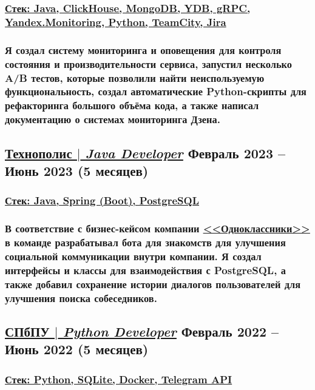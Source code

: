 \documentclass[11pt]{article}
\begin{document}
\subsubsection{\underline{\textbf{Стек}: Java, ClickHouse, MongoDB, YDB, gRPC, Yandex.Monitoring, Python, TeamCity, Jira}}
\subsubsection{Я создал \textbf{систему мониторинга и оповещения} для контроля состояния и производительности сервиса, запустил несколько \textbf{A/B тестов}, которые позволили найти неиспользуемую функциональность, создал \textbf{автоматические Python-скрипты} для рефакторинга большого объёма кода, а также \textbf{написал документацию} о системах мониторинга Дзена.}
\begin{itemize}
\end{itemize}

\subsection{\href{https://github.com/Sanerins/tamtam-one-coffee-bot}{\underline{Технополис $|$ {\normalfont\textit{Java Developer}}}} \hfill Февраль 2023 -- Июнь 2023 (5 месяцев)}
\subsubsection{\underline{\textbf{Стек}: Java, Spring (Boot), PostgreSQL}}
\subsubsection{В соответствие с бизнес-кейсом компании \href{https://ok.ru/}{\underline{<<Одноклассники>>}} в команде разрабатывал бота для знакомств для улучшения социальной коммуникации внутри компании. Я создал \textbf{интерфейсы и классы для взаимодействия с PostgreSQL}, а также добавил \textbf{сохранение истории диалогов пользователей} для улучшения поиска собеседников.}
\begin{itemize}
\end{itemize}

\subsection{\href{https://github.com/PaaavelZ/FPA-pybot}{\underline{СПбПУ $|$ {\normalfont\textit{Python Developer}}}} \hfill Февраль 2022 -- Июнь 2022 (5 месяцев)}
\subsubsection{\underline{\textbf{Стек}: Python, SQLite, Docker, Telegram API}}
\end{document}
